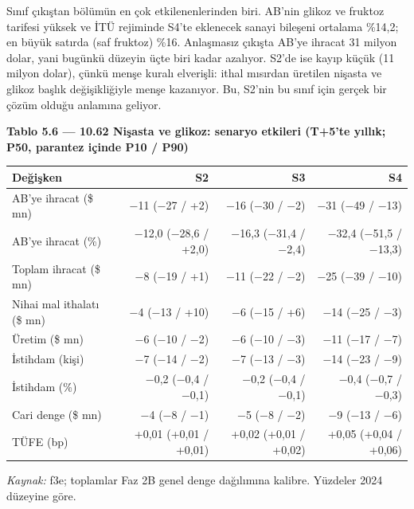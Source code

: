 Sınıf çıkıştan bölümün en çok etkilenenlerinden biri. AB'nin glikoz ve fruktoz tarifesi yüksek ve İTÜ rejiminde S4'te eklenecek sanayi bileşeni ortalama \%14,2; en büyük satırda (saf fruktoz) \%16. Anlaşmasız çıkışta AB'ye ihracat 31 milyon dolar, yani bugünkü düzeyin üçte biri kadar azalıyor. S2'de ise kayıp küçük (11 milyon dolar), çünkü menşe kuralı elverişli: ithal mısırdan üretilen nişasta ve glikoz başlık değişikliğiyle menşe kazanıyor. Bu, S2'nin bu sınıf için gerçek bir çözüm olduğu anlamına geliyor.


\textbf{Tablo 5.6 --- 10.62 Nişasta ve glikoz: senaryo etkileri (T+5'te yıllık; P50, parantez içinde P10 / P90)}

\nopagebreak[4]

\begingroup\gbtablo\small

\begin{longtable}[]{@{}lrrr@{}}
\toprule\noalign{}
\textbf{Değişken} & \textbf{S2} & \textbf{S3} & \textbf{S4} \\
\midrule\noalign{}
\endhead
\bottomrule\noalign{}
\endlastfoot
AB'ye ihracat (\$ mn) & −11 (−27 / +2) & −16 (−30 / −2) & −31 (−49 / −13) \\
AB'ye ihracat (\%) & −12,0 (−28,6 / +2,0) & −16,3 (−31,4 / −2,4) & −32,4 (−51,5 / −13,3) \\
Toplam ihracat (\$ mn) & −8 (−19 / +1) & −11 (−22 / −2) & −25 (−39 / −10) \\
Nihai mal ithalatı (\$ mn) & −4 (−13 / +10) & −6 (−15 / +6) & −14 (−25 / −3) \\
Üretim (\$ mn) & −6 (−10 / −2) & −6 (−10 / −3) & −11 (−17 / −7) \\
İstihdam (kişi) & −7 (−14 / −2) & −7 (−13 / −3) & −14 (−23 / −9) \\
İstihdam (\%) & −0,2 (−0,4 / −0,1) & −0,2 (−0,4 / −0,1) & −0,4 (−0,7 / −0,3) \\
Cari denge (\$ mn) & −4 (−8 / −1) & −5 (−8 / −2) & −9 (−13 / −6) \\
TÜFE (bp) & +0,01 (+0,01 / +0,01) & +0,02 (+0,01 / +0,02) & +0,05 (+0,04 / +0,06) \\
\end{longtable}

\endgroup

\emph{Kaynak:} \etiketT{} f3e; toplamlar Faz 2B genel denge dağılımına kalibre. Yüzdeler 2024 düzeyine göre.

